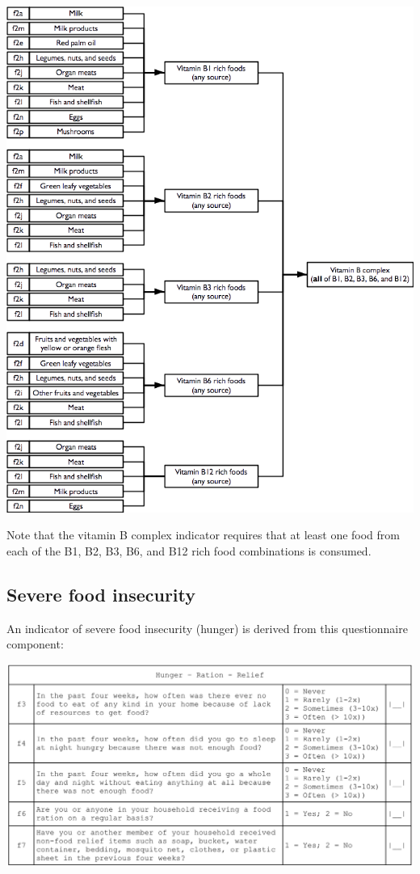 \documentclass[12pt,a4paper]{book}
\theoremstyle{definition}
\theoremstyle{definition}
\theoremstyle{definition}
\theoremstyle{remark}
\begin{document}
\begin{center}\includegraphics[width=9.76in]{figures/indicators14} \end{center}

Note that the vitamin B complex indicator requires that at least one
food from each of the B1, B2, B3, B6, and B12 rich food combinations is
consumed.

\hypertarget{severe-food-insecurity}{%
\subsection{Severe food insecurity}\label{severe-food-insecurity}}

An indicator of severe food insecurity (hunger) is derived from this
questionnaire component:

\begin{center}\includegraphics[width=23.88in]{figures/questionnaire03} \end{center}
\end{document}
